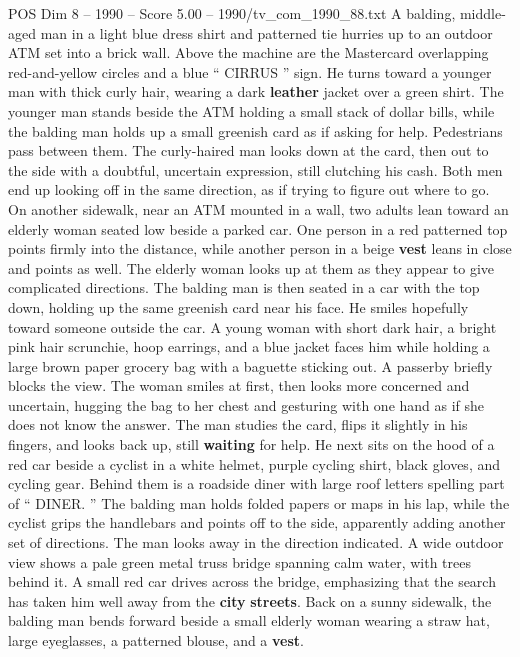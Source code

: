 \begin{textsample}{POS Dim 8 – 1990 – Score 5.00 – 1990/tv\_com\_1990\_88.txt}  \label{ex:f8_pos_065}
A balding, middle-aged man in a light blue dress shirt and patterned tie hurries up to an outdoor ATM set into a brick wall.
Above the machine are the Mastercard overlapping red-and-yellow circles and a blue “ CIRRUS ” sign.
He turns toward a younger man with thick curly hair, wearing a dark \textbf{leather} jacket over a green shirt.
The younger man stands beside the ATM holding a small stack of dollar bills, while the balding man holds up a small greenish card as if asking for help.
Pedestrians pass between them.
The curly-haired man looks down at the card, then out to the side with a doubtful, uncertain expression, still clutching his cash.
Both men end up looking off in the same direction, as if trying to figure out where to go.
On another sidewalk, near an ATM mounted in a wall, two adults lean toward an elderly woman seated low beside a parked car.
One person in a red patterned top points firmly into the distance, while another person in a beige \textbf{vest} leans in close and points as well.
The elderly woman looks up at them as they appear to give complicated directions.
The balding man is then seated in a car with the top down, holding up the same greenish card near his face.
He smiles hopefully toward someone outside the car.
A young woman with short dark hair, a bright pink hair scrunchie, hoop earrings, and a blue jacket faces him while holding a large brown paper grocery bag with a baguette sticking out.
A passerby briefly blocks the view.
The woman smiles at first, then looks more concerned and uncertain, hugging the bag to her chest and gesturing with one hand as if she does not know the answer.
The man studies the card, flips it slightly in his fingers, and looks back up, still \textbf{waiting} for help.
He next sits on the hood of a red car beside a cyclist in a white helmet, purple cycling shirt, black gloves, and cycling gear.
Behind them is a roadside diner with large roof letters spelling part of “ DINER. ” The balding man holds folded papers or maps in his lap, while the cyclist grips the handlebars and points off to the side, apparently adding another set of directions.
The man looks away in the direction indicated.
A wide outdoor view shows a pale green metal truss bridge spanning calm water, with trees behind it.
A small red car drives across the bridge, emphasizing that the search has taken him well away from the \textbf{city} \textbf{streets}.
Back on a sunny sidewalk, the balding man bends forward beside a small elderly woman wearing a straw hat, large eyeglasses, a patterned blouse, and a \textbf{vest}.

\end{textsample}
